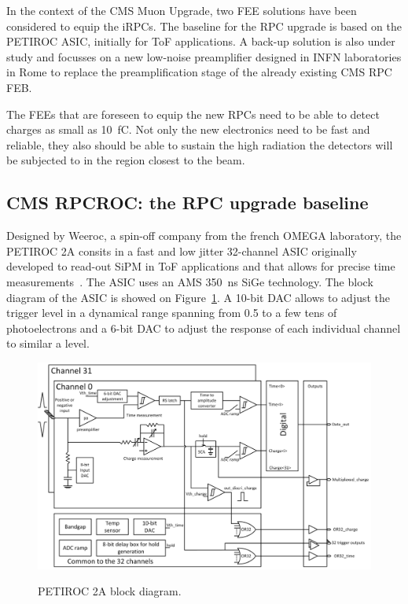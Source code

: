 	In the context of the CMS Muon Upgrade, two FEE solutions have been considered to equip the iRPCs. The baseline for the RPC upgrade is based on the PETIROC ASIC, initially for \acf{ToF} applications. A back-up solution is also under study and focusses on a new low-noise preamplifier designed in INFN laboratories in Rome to replace the preamplification stage of the already existing CMS RPC \acl{FEB}.

	The FEEs that are foreseen to equip the new RPCs need to be able to detect charges as small as \SI{10}{fC}. Not only the new electronics need to be fast and reliable, they also should be able to sustain the high radiation the detectors will be subjected to in the region closest to the beam.
	
	\subsection{CMS RPCROC: the RPC upgrade baseline}
	\label{chapt6:ssec:RPCROC}
	
	Designed by Weeroc, a spin-off company from the french OMEGA laboratory, the PETIROC 2A consits in a fast and low jitter 32-channel ASIC originally developed to read-out \acf{SiPM} in ToF applications and that allows for precise time measurements~\cite{PETIROCIEEE,PETIROCTWEPP}. The ASIC uses an AMS \SI{350}{ns} SiGe technology. The block diagram of the ASIC is showed on Figure~\ref{fig:PETIROCASIC}. A 10-bit DAC allows to adjust the trigger level in a dynamical range spanning from 0.5 to a few tens of photoelectrons and a 6-bit DAC to adjust the response of each individual channel to similar a level.
	
	\begin{figure}[H]
		\centering
		\includegraphics[width = \linewidth]{fig/chapt6/petiroc2.png}\\
		\caption{\label{fig:PETIROCASIC} PETIROC 2A block diagram.}
	\end{figure}
	

